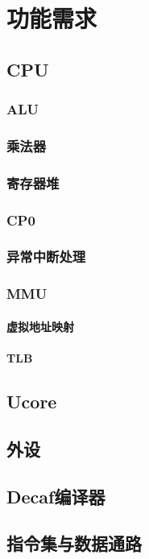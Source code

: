 \section{功能需求}
\subsection{CPU}
\subsubsection{ALU}
\subsubsection{乘法器}
\subsubsection{寄存器堆}
\subsubsection{CP0}
\subsubsection{异常中断处理}
\subsubsection{MMU}
\paragraph{虚拟地址映射}
\paragraph{TLB}
\subsection{Ucore}
\subsection{外设}
\subsection{Decaf编译器}
\subsection{指令集与数据通路}
